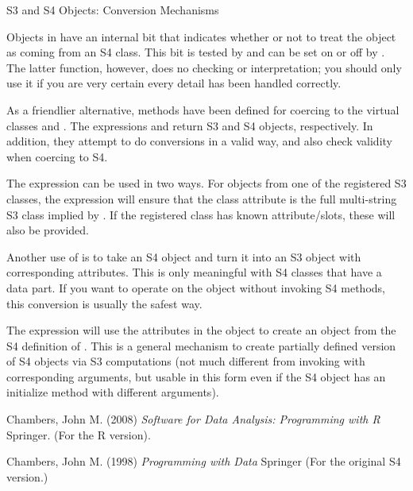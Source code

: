 \begin{Section}{S3 and S4 Objects: Conversion Mechanisms}

Objects in \R{} have an internal bit that indicates whether or not to
treat the object as coming from an S4 class.  This bit is tested by
 and can be set on or off by .
The latter function, however, does no checking or interpretation;
you should only use it if you are very certain every detail has been
handled correctly.

As a friendlier alternative, methods have been defined for coercing
to the virtual classes  and .  The expressions
  and   return S3
and S4 objects, respectively.  In addition, they attempt
to do conversions in a valid way, and also check validity when
coercing to S4.

The expression  can be used in two ways.  For
objects from one of the registered S3 classes, the expression will
ensure that the class attribute is the full multi-string S3 class
implied by .  If the registered class has known
attribute/slots, these will also be provided.

Another use of    is to take an S4 object and
turn it into an S3 object with corresponding attributes.  This is
only meaningful with S4 classes that have a data part.  If you want
to operate on the object without invoking S4 methods, this
conversion is usually the safest way.

The expression   will use the attributes in
the object to create an object from the S4 definition of
. This is a general mechanism to create
partially defined version of S4 objects via S3 computations  (not
much different from invoking  with corresponding
arguments, but usable in this form even if the S4 object has an
initialize method with different arguments). 
\end{Section}
%
\begin{References}\relax
Chambers, John M. (2008)
\emph{Software for Data Analysis: Programming with R}
Springer.  (For the R version).

Chambers, John M. (1998)
\emph{Programming with Data}
Springer (For the original S4 version.)
\end{References}
%
\begin{SeeAlso}\relax
\end{SeeAlso}
